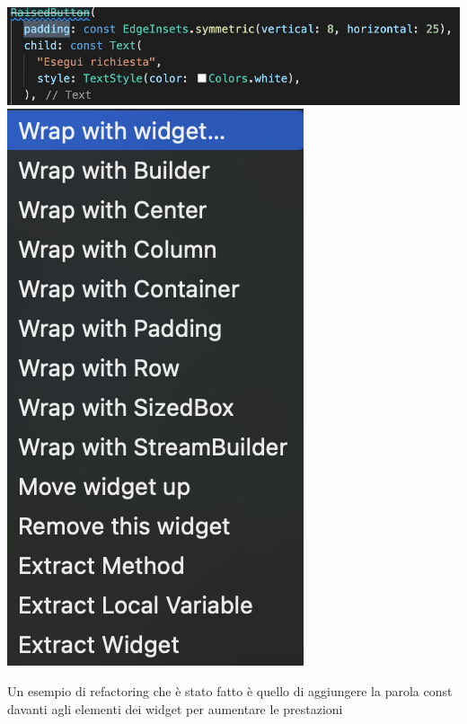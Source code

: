 \documentclass{article}
\begin{document}
\includegraphics[scale = 0.25]{"Immagini/ref1.PNG"}
\\\includegraphics[scale = 0.25]{"Immagini/ref2.PNG"}

Un esempio di refactoring che è stato fatto è quello di aggiungere la parola const davanti agli elementi dei widget per aumentare le prestazioni
\end{document}
